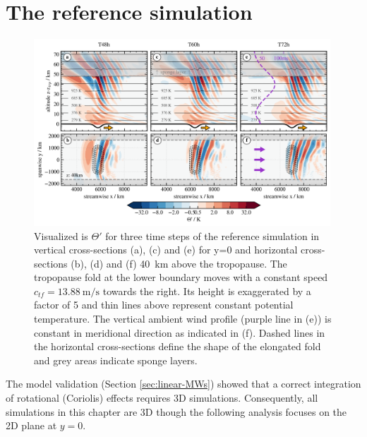 \section{The reference simulation}
\label{sec:resultsq3D-reference}
\begin{figure}[t]
    \centering
    \includegraphics[width=0.99\textwidth]{figures_q3D/Q3D-th-referenceSim.png}
    \caption{Visualized is $\Theta'$ for three time steps of the reference simulation in vertical cross-sections (a), (c) and (e) for y=0 and horizontal cross-sections (b), (d) and (f) \SI{40}{\kilo\meter} above the tropopause. The tropopause fold at the lower boundary moves with a constant speed $c_{tf}=\SI{13.88}{\meter\per\second}$ towards the right. Its height is exaggerated by a factor of 5 and thin lines above represent constant potential temperature. The vertical ambient wind profile (purple line in (e)) is constant in meridional direction as indicated in (f). Dashed lines in the horizontal cross-sections define the shape of the elongated fold and grey areas indicate sponge layers.}
    \label{fig:q3D_referenceSim}
\end{figure}
%
The model validation (Section \ref{sec:linear-MWs}) showed that a correct integration of rotational (Coriolis) effects requires 3D simulations. Consequently, all simulations in this chapter are 3D though the following analysis focuses on the 2D plane at $y=0$. \\
